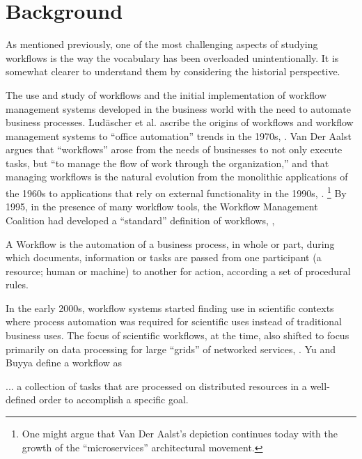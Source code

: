 \section{Background}\label{workflows}

As mentioned previously, one of the most challenging aspects of studying
workflows is the way the vocabulary has been overloaded unintentionally.
It is somewhat clearer to understand them by considering the historial
perspective.

The use and study of workflows and the initial implementation of
workflow management systems developed in the business world with the
need to automate business processes. Lud\"{a}scher et al. ascribe the
origins of workflows and workflow management systems to ``office
automation'' trends in the 1970s, \cite{ludascher_scientific_2006}. Van Der
Aalst argues that ``workflows'' arose from the needs of businesses to not only
execute tasks, but ``to manage the flow of work through the
organization,'' and that managing workflows is the natural evolution
from the monolithic applications of the 1960s to applications that rely
on external functionality in the 1990s, \cite{van_der_aalst_application_1998}.
\footnote{One might argue that Van Der Aalst's depiction continues today with the
growth of the ``microservices'' architectural movement.} By 1995, in the
presence of many workflow tools, the Workflow Management Coalition had developed a ``standard'' definition of
workflows, \cite{hollingsworth_workflow_1993},

\begin{displayquote}
A Workflow is the automation of a business process, in whole or part, during
which documents, information or tasks are passed from one participant (a 
resource; human or machine) to another for action, according a set of 
procedural rules. 
\end{displayquote}

In the early 2000s, workflow systems started finding use in scientific
contexts where process automation was required for scientific uses
instead of traditional business uses. The focus of scientific workflows,
at the time, also shifted to focus primarily on data processing for
large ``grids'' of networked services, \cite{yu_taxonomy_2005}. Yu and Buyya
define a workflow as

\begin{displayquote}
... a collection of tasks that are processed on distributed resources in a
well-defined order to accomplish a specific goal.
\end{displayquote}

